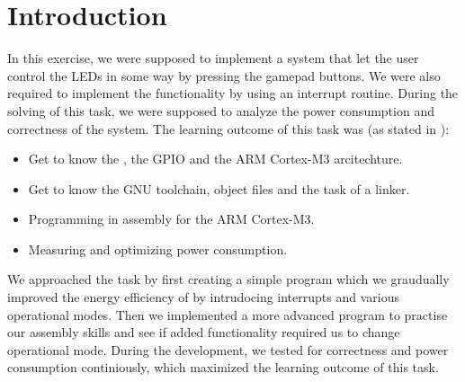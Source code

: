 \section{Introduction}
In this exercise, we were supposed to implement a system that let the user control the LEDs in some way by pressing the gamepad buttons. We were also required to implement the functionality by using an interrupt routine. During the solving of this task, we were supposed to analyze the power consumption and correctness of the system. The learning outcome of this task was (as stated in \cite[p. 19]{compendium}):
\begin{itemize}
	\item Get to know the \boardName, the GPIO and the ARM Cortex-M3 arcitechture.
	\item Get to know the GNU toolchain, object files and the task of a linker.
	\item Programming in assembly for the ARM Cortex-M3.
	\item Measuring and optimizing power consumption.
\end{itemize}
We approached the task by first creating a simple program which we graudually improved the energy efficiency of by intrudocing interrupts and various operational modes. Then we implemented a more advanced program to practise our assembly skills and see if added functionality required us to change operational mode. During the development, we tested for correctness and power consumption continiously, which maximized the learning outcome of this task.

